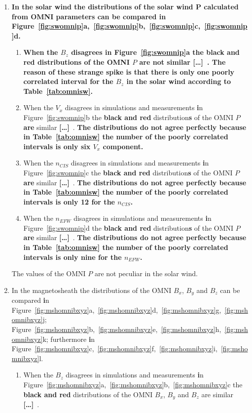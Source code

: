 \documentclass[linenumbers,draft]{agujournal}
\newcommand{\del}{\textbf{[\dots]}\ } %
\begin{document}
\begin{enumerate}
\item \textbf{In the solar wind the distributions of the solar wind P calculated from OMNI parameters can be compared \textbf{i}n Figure~\ref{fig:swomnip}a,~\ref{fig:swomnip}b,~\ref{fig:swomnip}c,~\ref{fig:swomnip}d.}
\begin{enumerate}
\item \textbf{When the $B_{z}$ disagrees \textbf{i}n Figure~\ref{fig:swomnip}a the \textbf{black and red} distribution\textbf{s} of the OMNI $P$ \textbf{are} not similar \del . The reason of these strange spike is that there is only one poorly correlated interval for the $B_{z}$ in the solar wind according to Table~\ref{tab:omnisw}.}
    
\item When the $V_{x}$ disagrees in simulations and measurements \textbf{i}n Figure~\ref{fig:swomnip}b the \textbf{black and red} distribution\textbf{s} of the OMNI $P$ \textbf{are} similar \del . \textbf{The distributions do not agree perfectly because in Table~\ref{tab:omnisw} the number of the poorly correlated intervals is only six $V_{x}$ component.}

\item When the $n_{CIS}$ disagrees in simulations and measurements \textbf{i}n Figure~\ref{fig:swomnip}c the \textbf{black and red} distribution\textbf{s} of the OMNI $P$ \textbf{are} similar \del . \textbf{The distributions do not agree perfectly because in Table~\ref{tab:omnisw} the number of the poorly correlated intervals is only 12 for the $n_{CIS}$.}

\item When the $n_{EFW}$ disagrees in simulations and measurements \textbf{i}n Figure~\ref{fig:swomnip}d the \textbf{black and red} distribution\textbf{s} of the OMNI $P$ \textbf{are} similar \del . \textbf{The distributions do not agree perfectly because in Table~\ref{tab:omnisw} the number of the poorly correlated intervals is only nine for the $n_{EFW}$.}
\end{enumerate}
The values of the OMNI $P$ are not peculiar in the solar wind. 

\item In the magnetosheath the distributions of the OMNI $B_{x}$, $B_{y}$ and $B_{z}$ can be compared \textbf{i}n Figure~\ref{fig:mshomnibxyz}a,~\ref{fig:mshomnibxyz}d,~\ref{fig:mshomnibxyz}g,~\ref{fig:mshomnibxyz}j; Figure~\ref{fig:mshomnibxyz}b,~\ref{fig:mshomnibxyz}e,~\ref{fig:mshomnibxyz}h,~\ref{fig:mshomnibxyz}k; furthermore \textbf{i}n Figure~\ref{fig:mshomnibxyz}c,~\ref{fig:mshomnibxyz}f,~\ref{fig:mshomnibxyz}i,~\ref{fig:mshomnibxyz}l. 
\begin{enumerate}
\item When the $B_{z}$ disagrees in simulations and measurements \textbf{i}n Figure~\ref{fig:mshomnibxyz}a,~\ref{fig:mshomnibxyz}b,~\ref{fig:mshomnibxyz}c the \textbf{black and red} distributions of the OMNI $B_{x}$, $B_{y}$ and $B_{z}$ are similar \del.


\end{enumerate}
\end{enumerate}
\end{document}
